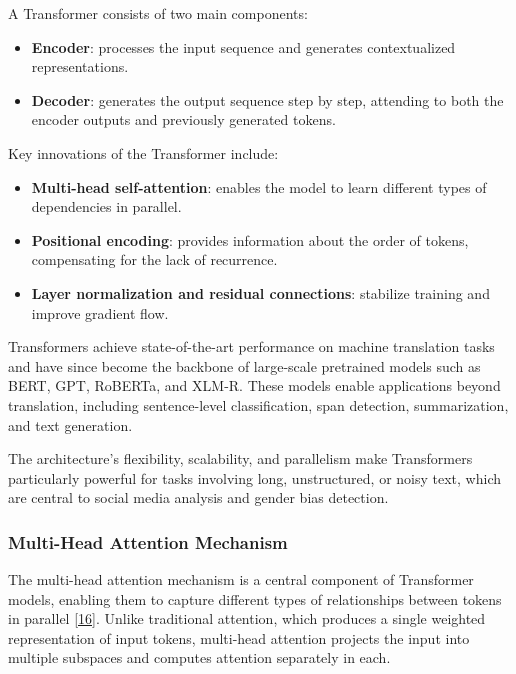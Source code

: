 \documentclass[12pt,oneside,openright,a4paper]{cpe-english-project}
\begin{document}
A Transformer consists of two main components:

\begin{itemize}
\item
  {\textbf{Encoder}: processes the input sequence and generates contextualized representations.}
\item
  {\textbf{Decoder}: generates the output sequence step by step, attending to both the encoder outputs and previously generated tokens.}
\end{itemize}

Key innovations of the Transformer include:

\begin{itemize}
\item
  {\textbf{Multi-head self-attention}: enables the model to learn different types of dependencies in parallel.}
\item
  {\textbf{Positional encoding}: provides information about the order of tokens, compensating for the lack of recurrence.}
\item
  {\textbf{Layer normalization and residual connections}: stabilize training and improve gradient flow.}
\end{itemize}

Transformers achieve state-of-the-art performance on machine translation tasks and have since become the backbone of large-scale pretrained models such as BERT, GPT, RoBERTa, and XLM-R. These models enable applications beyond translation, including sentence-level classification, span detection, summarization, and text generation.

The architecture's flexibility, scalability, and parallelism make Transformers particularly powerful for tasks involving long, unstructured, or noisy text, which are central to social media analysis and gender bias detection.

\subsubsection{Multi-Head Attention Mechanism}

The multi-head attention mechanism is a central component of Transformer models, enabling them to capture different types of relationships between tokens in parallel \hyperlink{bib:ref16}{[16]}. Unlike traditional attention, which produces a single weighted representation of input tokens, multi-head attention projects the input into multiple subspaces and computes attention separately in each.
\end{document}
